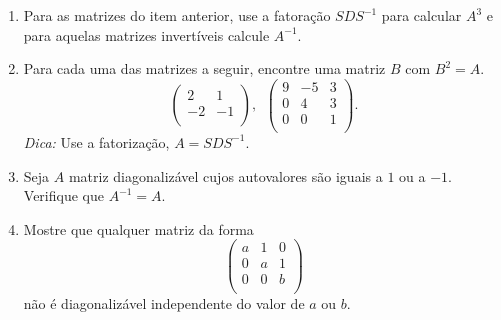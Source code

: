 \documentclass[10pt]{article}
\theoremstyle{plain}
\theoremstyle{obs}
\numberwithin{equation}{section}
\begin{document}
\begin{enumerate}
 (f) Não é diagonalizável
 
 (g) $ P=\begin{pmatrix}
-3 & 1 & 1 \\
0 & -6 & 0 \\
2 & 4 & 1 \\
\end{pmatrix}, \ \
D=
\begin{pmatrix}
-1 & 0 & 0 \\%
0 & 1 & 0 \\
0 & 0 & 4 \\
\end{pmatrix}
 $
 
 (h)
 $ P=\begin{pmatrix}
-1& 2 & 1 \\
0 & 1 & 0 \\
3 & 0 & 0 \\
\end{pmatrix}, \ \
D=
\begin{pmatrix}
0 & 0 & 0 \\%
0 & 2 & 0 \\
0 & 0 & 3 \\
\end{pmatrix}
 $
 
 \item Para as matrizes do item anterior, use a fatoração $SDS^{-1}$ 
 para calcular $A^{3}$ e para aquelas matrizes invertíveis
 calcule $A^{-1}$.
 \item Para cada uma das matrizes a seguir, encontre uma matriz $B$ com $B^{2}=A$.
    $$
\begin{pmatrix}
2 & 1 \\
-2 & -1 \\
\end{pmatrix}, \ \ 
\begin{pmatrix}
9 & -5 & 3 \\
0 & 4 & 3 \\
0 & 0 & 1 \\
\end{pmatrix}. 
$$
 {\it Dica:} Use a fatorização, $A=SDS^{-1}$.
 \item Seja $A$ matriz diagonalizável cujos autovalores são iguais a $1$ ou a $-1$.
 Verifique que $A^{-1}=A$.
 \item Mostre que qualquer matriz da forma
  $$
\begin{pmatrix}
a & 1 & 0 \\
0 & a & 1 \\
0 & 0 & b \\
\end{pmatrix}
 $$
não é diagonalizável independente do valor de $a$ ou $b$.


\end{enumerate}
\end{document}
